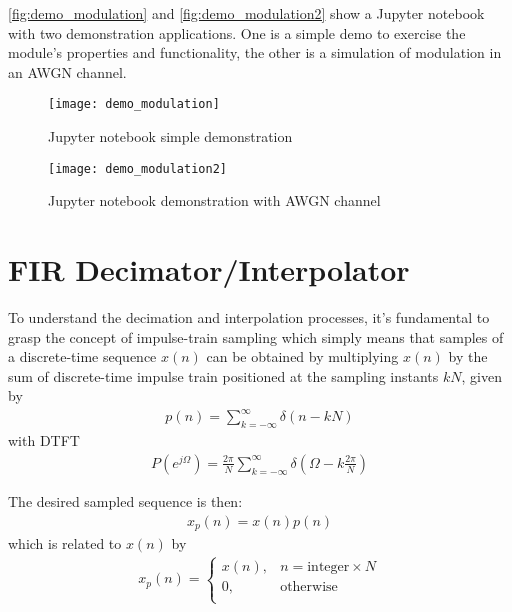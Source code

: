 \autoref{fig:demo_modulation} and \autoref{fig:demo_modulation2} show a Jupyter notebook with two demonstration applications. One is a simple demo to exercise the module's properties and functionality, the other is a simulation of modulation in an AWGN channel.

\begin{figure}[H]
  \centering
  \texttt{[image: demo\_modulation]}
  \caption{ Jupyter notebook simple demonstration}
  \label{fig:demo_modulation}
\end{figure}

\begin{figure}[H]
  \centering
  \texttt{[image: demo\_modulation2]}
  \caption{ Jupyter notebook demonstration with AWGN channel}
  \label{fig:demo_modulation2}
\end{figure}

\section{FIR Decimator/Interpolator}

To understand the decimation and interpolation processes, it's fundamental to grasp the concept of impulse-train sampling which simply means that samples of a discrete-time sequence $x(n)$ can be obtained by multiplying $x(n)$ by the sum of discrete-time impulse train positioned at the sampling instants $kN$, given by
\begin{align}
  p(n)=\sum_{k=-\infty}^{\infty}\delta(n-kN)
\end{align}
with DTFT
\begin{align}
  P(e^{j\Omega})=\frac{2\pi}{N}\sum_{k=-\infty}^{\infty}\delta\left(\Omega-k\frac{2\pi}{N}\right)
\end{align}

The desired sampled sequence is then:
\begin{align} \label{eq:x_pn}
  x_p(n) = x(n)p(n)
\end{align}
which is related to $x(n)$ by
\begin{align} \label{eq:x_p}
  x_p(n) =
  \begin{cases}
    x(n), & n=\text{integer} \times N\\
    0,    & \text{otherwise}\\
  \end{cases}
\end{align}

